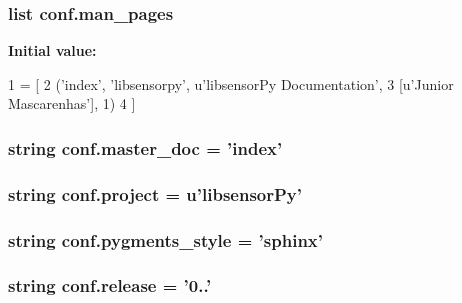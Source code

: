 \subsubsection[{man\+\_\+pages}]{\setlength{\rightskip}{0pt plus 5cm}list conf.\+man\+\_\+pages}\label{namespaceconf_a85efc5fee48a26fa2d651f6eeb38fc2b}
{\bfseries Initial value\+:}
\begin{DoxyCode}
1 = [
2     (\textcolor{stringliteral}{'index'}, \textcolor{stringliteral}{'libsensorpy'}, \textcolor{stringliteral}{u'libsensorPy Documentation'},
3      [\textcolor{stringliteral}{u'Junior Mascarenhas'}], 1)
4 ]
\end{DoxyCode}
\hypertarget{namespaceconf_a6fcd7e5236f355b1e1a55f9d95988810}{}
\subsubsection[{master\+\_\+doc}]{\setlength{\rightskip}{0pt plus 5cm}string conf.\+master\+\_\+doc = 'index'}\label{namespaceconf_a6fcd7e5236f355b1e1a55f9d95988810}
\hypertarget{namespaceconf_a45653c983098153b78e33600e39230eb}{}
\subsubsection[{project}]{\setlength{\rightskip}{0pt plus 5cm}string conf.\+project = u'libsensor\+Py'}\label{namespaceconf_a45653c983098153b78e33600e39230eb}
\hypertarget{namespaceconf_a641130e096b26cba8a5d63ed38684de7}{}
\subsubsection[{pygments\+\_\+style}]{\setlength{\rightskip}{0pt plus 5cm}string conf.\+pygments\+\_\+style = 'sphinx'}\label{namespaceconf_a641130e096b26cba8a5d63ed38684de7}
\hypertarget{namespaceconf_a325dc746d8bf05c54d26351c35a21d90}{}
\subsubsection[{release}]{\setlength{\rightskip}{0pt plus 5cm}string conf.\+release = '0..'}\label{namespaceconf_a325dc746d8bf05c54d26351c35a21d90}
\hypertarget{namespaceconf_a10af2a769eb3bd3322e874f677e435b1}{}
